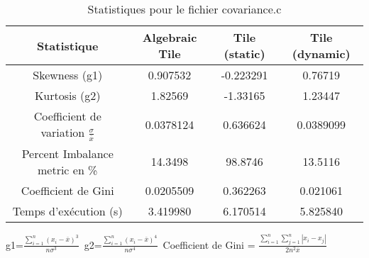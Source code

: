 \documentclass{article}
\begin{document}
\begin{table}[htbp]
  \centering
  \caption{Statistiques pour le fichier covariance.c}
  \begin{tabular}{|c|c|c|c|}
    \hline
    Statistique & Algebraic Tile & Tile (static) & Tile (dynamic) \\ 
    \hline
    Skewness (g1)  & 0.907532 & -0.223291 & 0.76719 \\ 
    Kurtosis (g2)  & 1.82569 & -1.33165 & 1.23447 \\ 
    Coefficient de variation $ \frac{\sigma}{\overline{x}} $ & 0.0378124 & 0.636624 & 0.0389099\\ 
    Percent Imbalance metric en \% & 14.3498 & 98.8746 & 13.5116\\ 
    Coefficient de Gini  & 0.0205509 & 0.362263 & 0.021061\\ 
    Temps d'exécution (s) &  3.419980 &  6.170514   &  5.825840   \\ 

    \hline
  \end{tabular}
\end{table}
g1=$ \frac{\sum_{i=1}^{n} (x_i - \overline{x})^3}{n\sigma^3} $\
g2=$ \frac{\sum_{i=1}^{n} (x_i - \overline{x})^4}{n\sigma^4} $\
Coefficient de Gini = $ \frac{\sum_{i=1}^{n}\sum_{j=1}^{n} |x_i - x_j|}{2n^2\overline{x}} $\
\newpage

  
\end{document}
